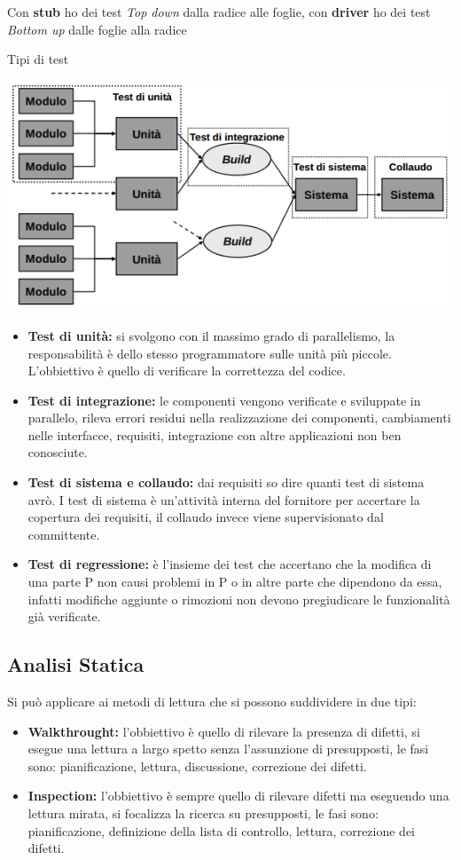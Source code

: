 Con \textbf{stub} ho dei test \textit{Top down} dalla radice alle foglie, con \textbf{driver} ho dei test \textit{Bottom up} dalle foglie alla radice

Tipi di test

\includegraphics[width=0.5\columnwidth]{img4} %

\begin{itemize}
	\item \textbf{Test di unità:} si svolgono con il massimo grado di parallelismo, la responsabilità è dello stesso programmatore sulle unità più piccole. L'obbiettivo è quello di verificare la correttezza del codice.
	\item \textbf{Test di integrazione:} le componenti vengono verificate e sviluppate in parallelo, rileva errori residui nella realizzazione dei componenti, cambiamenti nelle interfacce, requisiti, integrazione con altre applicazioni non ben conosciute.
	\item \textbf{Test di sistema e collaudo:} dai requisiti so dire quanti test di sistema avrò. I test di sistema è un'attività interna del fornitore per accertare la copertura dei requisiti, il collaudo invece viene supervisionato dal committente.
	\item \textbf{Test di regressione:} è l'insieme dei test che accertano che la modifica di una parte P non causi problemi in P o in altre parte che dipendono da essa, infatti modifiche aggiunte o rimozioni non devono pregiudicare le funzionalità già verificate.
\end{itemize}

\subsection{Analisi Statica}
Si può applicare ai metodi di lettura che si possono suddividere in due tipi:
\begin{itemize}
	\item \textbf{Walkthrought:} l'obbiettivo è quello di rilevare la presenza di difetti, si esegue una lettura a largo spetto senza l'assunzione di presupposti, le fasi sono: pianificazione, lettura, discussione, correzione dei difetti. 
	\item \textbf{Inspection:} l'obbiettivo è sempre quello di rilevare difetti ma eseguendo una lettura mirata, si focalizza la ricerca su presupposti, le fasi sono: pianificazione, definizione della lista di controllo, lettura, correzione dei difetti.
\end{itemize}

